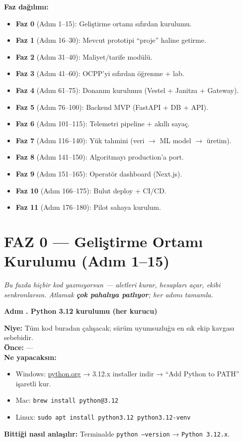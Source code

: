 \documentclass[11pt,a4paper]{article}
\newcounter{adim}
\newcommand{\adim}[1]{%
    \refstepcounter{adim}%
    \vspace{0.6em}%
    \noindent\textbf{\large Adım \theadim. #1}\par%
    \vspace{0.2em}%
}
\begin{document}
\textbf{Faz dağılımı:}
\begin{itemize}
    \item \textbf{Faz 0} (Adım 1--15): Geliştirme ortamı sıfırdan kurulumu.
    \item \textbf{Faz 1} (Adım 16--30): Mevcut prototipi ``proje'' haline getirme.
    \item \textbf{Faz 2} (Adım 31--40): Maliyet/tarife modülü.
    \item \textbf{Faz 3} (Adım 41--60): OCPP'yi sıfırdan öğrenme + lab.
    \item \textbf{Faz 4} (Adım 61--75): Donanım kurulumu (Vestel + Janitza + Gateway).
    \item \textbf{Faz 5} (Adım 76--100): Backend MVP (FastAPI + DB + API).
    \item \textbf{Faz 6} (Adım 101--115): Telemetri pipeline + akıllı sayaç.
    \item \textbf{Faz 7} (Adım 116--140): Yük tahmini (veri $\to$ ML model $\to$ üretim).
    \item \textbf{Faz 8} (Adım 141--150): Algoritmayı production'a port.
    \item \textbf{Faz 9} (Adım 151--165): Operatör dashboard (Next.js).
    \item \textbf{Faz 10} (Adım 166--175): Bulut deploy + CI/CD.
    \item \textbf{Faz 11} (Adım 176--180): Pilot sahaya kurulum.
\end{itemize}

\newpage
\section{FAZ 0 --- Geliştirme Ortamı Kurulumu (Adım 1--15)}

\textit{Bu fazda hiçbir kod yazmıyorsun --- aletleri kurar, hesapları açar, ekibi senkronlarsın. Atlamak \textbf{çok pahalıya patlıyor}; her adımı tamamla.}

\adim{Python 3.12 kurulumu (her kurucu)}
\textbf{Niye:} Tüm kod buradan çalışacak; sürüm uyumsuzluğu en sık ekip kavgası sebebidir.\\
\textbf{Önce:} ---\\
\textbf{Ne yapacaksın:}
\begin{itemize}
    \item Windows: \href{https://www.python.org/downloads/}{python.org} → 3.12.x installer indir → ``Add Python to PATH'' işaretli kur.
    \item Mac: \texttt{brew install python@3.12}
    \item Linux: \texttt{sudo apt install python3.12 python3.12-venv}
\end{itemize}
\textbf{Bittiği nasıl anlaşılır:} Terminalde \texttt{python --version} → \texttt{Python 3.12.x}.
\end{document}
